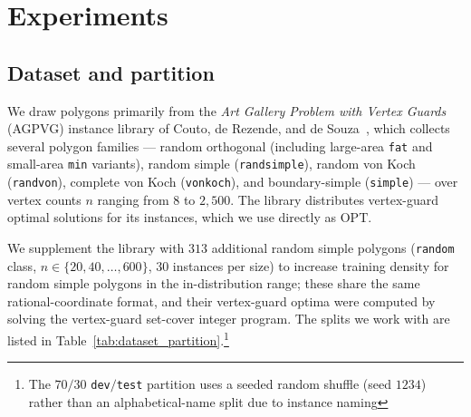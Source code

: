 \documentclass[preprint,10pt]{elsarticle}
\newcommand{\OPT}{\mathrm{OPT}}
\begin{document}
\section{Experiments}
\label{sec:experiments}

\subsection{Dataset and partition}
\label{sec:exp-dataset}

We draw polygons primarily from the \emph{Art Gallery Problem with Vertex Guards} (AGPVG) instance library of Couto, de Rezende, and de Souza~\cite{art-gallery-instances-page,Couto2011ExactAGP}, which collects several polygon families --- random orthogonal (including large-area \texttt{fat} and small-area \texttt{min} variants), random simple (\texttt{randsimple}), random von Koch (\texttt{randvon}), complete von Koch (\texttt{vonkoch}), and boundary-simple (\texttt{simple}) --- over vertex counts $n$ ranging from $8$ to $2{,}500$. The library distributes vertex-guard optimal solutions for its instances, which we use directly as $\OPT$.

We supplement the library with $313$ additional random simple polygons (\texttt{random} class, $n \in \{20, 40, \dots, 600\}$, $30$ instances per size) to increase training density for random simple polygons in the in-distribution range; these share the same rational-coordinate format, and their vertex-guard optima were computed by solving the vertex-guard set-cover integer program. The splits we work with are listed in Table~\ref{tab:dataset_partition}.\footnote{The $70/30$ \texttt{dev}$/$\texttt{test} partition uses a seeded random shuffle (seed $1234$) rather than an alphabetical-name split due to instance naming}

\begin{table}[t]
  \centering
  \small
  
  \caption{Dataset partition. The \texttt{dev} and \texttt{test} splits share the same source library files, partitioned $70/30$ by seeded random shuffle (seed $1234$): \texttt{dev} is used for checkpoint selection and \texttt{test} is the in-distribution held-out evaluation. The \texttt{ood} split is a larger held-out set spanning the training size range and extending well beyond it, to $n = 1000$ (about five times the training maximum); its genuinely larger-than-training polygons ($n > 198$) are analyzed separately in Section~\ref{sec:res-ood}. The \texttt{ood-large} split is used for an extreme-OOD evaluation (Table~\ref{tab:large}). All counts are post-exclusion of the source-directory overlaps noted in Section~\ref{sec:limitations}, so \texttt{test} and \texttt{ood} are disjoint from \texttt{train}.}
  \label{tab:dataset_partition}
\end{table}
\end{document}
